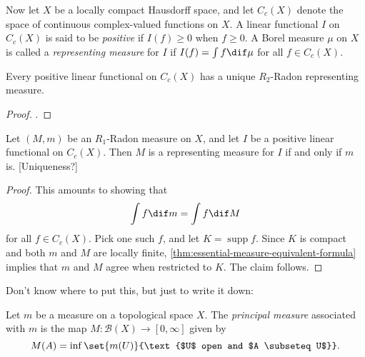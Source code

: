 \documentclass[article, a4paper, 11pt, oneside]{memoir}
\numberwithin{equation}{chapter}
\newcommand{\calB}{\mathcal{B}}
\newcommand{\borel}[1]{\calB(#1)}
\DeclareMathOperator{\supp}{supp}
\begin{document}
Now let $X$ be a locally compact Hausdorff space, and let $C_c(X)$ denote the space of continuous complex-valued functions on $X$. A linear functional $I$ on $C_c(X)$ is said to be \emph{positive} if $I(f) \geq 0$ when $f \geq 0$. A Borel measure $\mu$ on $X$ is called a \emph{representing measure} for $I$ if $I(f) = \int f \dif\mu$ for all $f \in C_c(X)$.

\begin{theorem}
    Every positive linear functional on $C_c(X)$ has a unique $R_2$-Radon representing measure.
\end{theorem}

\begin{proof}
    \textcite[Theorem~7.2]{folland2007}.
\end{proof}

\begin{proposition}
    Let $(M,m)$ be an $R_1$-Radon measure on $X$, and let $I$ be a positive linear functional on $C_c(X)$. Then $M$ is a representing measure for $I$ if and only if $m$ is. [Uniqueness?]
\end{proposition}

\begin{proof}
    This amounts to showing that
    \begin{equation*}
        \int f \dif m = \int f \dif M
    \end{equation*}
    for all $f \in C_c(X)$. Pick one such $f$, and let $K = \supp f$. Since $K$ is compact and both $m$ and $M$ are locally finite, \cref{thm:essential-measure-equivalent-formula} implies that $m$ and $M$ agree when restricted to $K$. The claim follows.
\end{proof}


Don't know where to put this, but just to write it down:

\begin{definition}
    Let $m$ be a measure on a topological space $X$. The \emph{principal measure}\footnotemark{} associated with $m$ is the map $M \colon \borel{X} \to [0,\infty]$ given by
    \begin{equation*}
        M(A)
            = \inf \set{m(U)}{\text{$U$ open and $A \subseteq U$}}.
    \end{equation*}
\end{definition}
\end{document}
